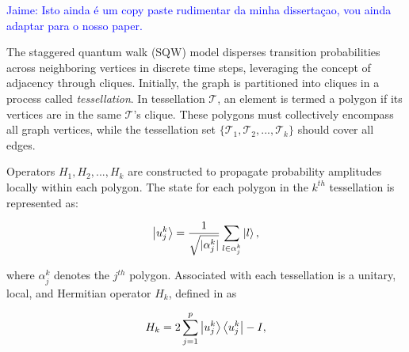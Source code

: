 \documentclass[../../main.tex]{subfiles}
\begin{document}
{\large
\textcolor{blue}{Jaime: Isto ainda é um copy paste rudimentar da minha dissertaçao,
vou ainda adaptar para o nosso paper.}\par
}



The staggered quantum walk (SQW) model disperses transition probabilities
across neighboring vertices in discrete time steps, leveraging the concept of
adjacency through cliques. Initially, the graph is partitioned into cliques in
a process called \textit{tessellation}. In tessellation $\mathscr{T}$, an
element is termed a polygon if its vertices are in the same $\mathscr{T}$'s
clique. These polygons must collectively encompass all graph vertices, while
the tessellation set $\{\mathscr{T}_{1}, \mathscr{T}_{2},...,
\mathscr{T}_{k}\}$ should cover all edges.


Operators $H_1,H_2,...,H_k$ are constructed to propagate probability amplitudes
locally within each polygon. The state for each polygon in the $k^{th}$
tessellation is represented as:

\begin{equation}
	\ket{u_{j}^{k}} = \frac{1}{\sqrt{|\alpha_{j}^{k}|}}\sum_{l\in\alpha_{j}^{k}}\ket{l},
\end{equation}

where $\alpha_{j}^{k}$ denotes the $j^{th}$ polygon. Associated with each
tessellation is a unitary, local, and Hermitian operator $H_k$, defined in
\cite{PhysRevA.95.012328} as

\begin{equation}
	H_k = 2\sum_{j=1}^{p}\ket{u_{j}^{k}}\bra{u_{j}^{k}} - I,
\end{equation}
\end{document}
